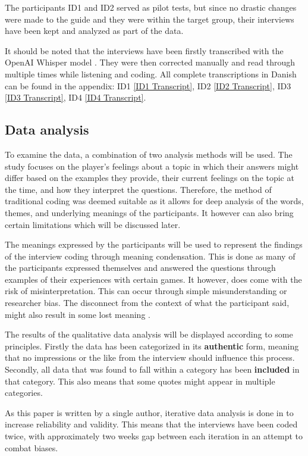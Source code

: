The participants ID1 and ID2 served as pilot tests, but since no drastic changes were made to the guide and they were within the target group, their interviews have been kept and analyzed as part of the data.

It should be noted that the interviews have been firstly transcribed with the OpenAI Whisper model \cite{noauthor_openai_nodate}. They were then corrected manually and read through multiple times while listening and coding. All complete transcriptions in Danish can be found in the appendix: ID1  \ref{ID1 Transcript}, ID2 \ref{ID2 Transcript}, ID3 \ref{ID3 Transcript}, ID4 \ref{ID4 Transcript}.

\subsection{Data analysis}
To examine the data, a combination of two analysis methods will be used. The study focuses on the player's feelings about a topic in which their answers might differ based on the examples they provide, their current feelings on the topic at the time, and how they interpret the questions. Therefore, the method of traditional coding was deemed suitable as it allows for deep analysis of the words, themes, and underlying meanings of the participants. It however can also bring certain limitations which will be discussed later.

The meanings expressed by the participants will be used to represent the findings of the interview coding through meaning condensation. This is done as many of the participants expressed themselves and answered the questions through examples of their experiences with certain games. It however, does come with the risk of misinterpretation. This can occur through simple misunderstanding or researcher bias. The disconnect from the context of what the participant said, might also result in some lost meaning \cite{thomas_bjorner_qualitative_2015}. 

The results of the qualitative data analysis will be displayed according to some principles. Firstly the data has been categorized in its \textbf{authentic} form, meaning that no impressions or the like from the interview should influence this process. Secondly, all data that was found to fall within a category has been \textbf{included} in that category. This also means that some quotes might appear in multiple categories. 

As this paper is written by a single author, iterative data analysis is done in to increase reliability and validity. This means that the interviews have been coded twice, with approximately two weeks gap between each iteration in an attempt to combat biases.

